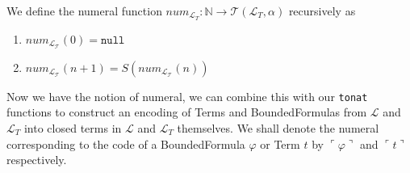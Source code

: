 \begin{definition}\label{def:L_T-Numeral}
  \leanok
  We define the numeral function $num_{\mathcal{L}_T} : \mathbb{N} \to \mathcal{T}(\mathcal{L}_T,\alpha)$ recursively as
  \begin{enumerate}
  \item $num_{\mathcal{L_T}}(0) = \texttt{null}$
  \item $num_{\mathcal{L_T}}(n + 1) = S(num_{\mathcal{L_T}}(n))$
  \end{enumerate}
\end{definition}

Now we have the notion of numeral, we can combine this with our \texttt{tonat} functions to construct an encoding of Terms and BoundedFormulas from $\mathcal{L}$ and $\mathcal{L}_T$ into closed terms in $\mathcal{L}$ and $\mathcal{L}_T$ themselves. We shall denote the numeral corresponding to the code of a BoundedFormula $\varphi$ or Term $t$ by $\ulcorner \varphi \urcorner$ and $\ulcorner t \urcorner$ respectively.


